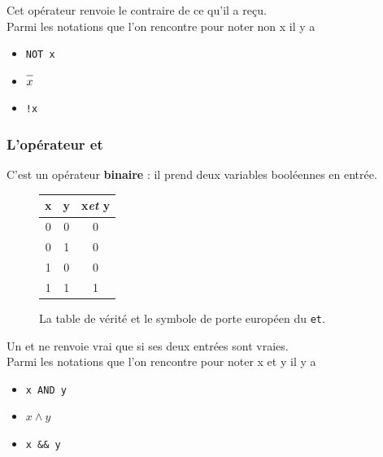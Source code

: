 Cet opérateur renvoie \og le contraire de ce qu'il a reçu\fg{}.\\
Parmi les notations que l'on rencontre pour noter \og non x\fg{} il y a
\begin{itemize}
    \item 	 \texttt{NOT x}
    \item 	$\barmin{x}$
    \item 	\texttt{!x}
\end{itemize}


\subsubsection*{L'opérateur \og et\fg{}}

C'est un opérateur \textbf{binaire} : il prend deux variables booléennes en entrée.

\begin{figure}[H]
    \begin{center}
        \begin{tabular}{|c|c|c|}
            \hline\rowcolor{UGLiOrange}
            {\boxfont\color{white}x} & {\boxfont\color{white}y} & {\boxfont\color{white}x\textit{et} y} \\
            \hline
            0                        & 0                        & 0                                     \\
            \hline
            0                        & 1                        & 0                                     \\
            \hline
            1                        & 0                        & 0                                     \\
            \hline
            1                        & 1                        & 1                                     \\
            \hline
        \end{tabular}
        \hspace{3em}
    \end{center}
    \caption*{La table de vérité et le symbole de porte européen du \texttt{et}.}
\end{figure}
Un \og et\fg{} ne renvoie vrai que si ses deux entrées sont vraies.\\
Parmi les notations que l'on rencontre pour noter \og x et y\fg{} il y a
\begin{itemize}
    \item 	 \texttt{x AND y}
    \item 	$x\wedge y$
    \item 	\texttt{x \&\& y}
\end{itemize}


